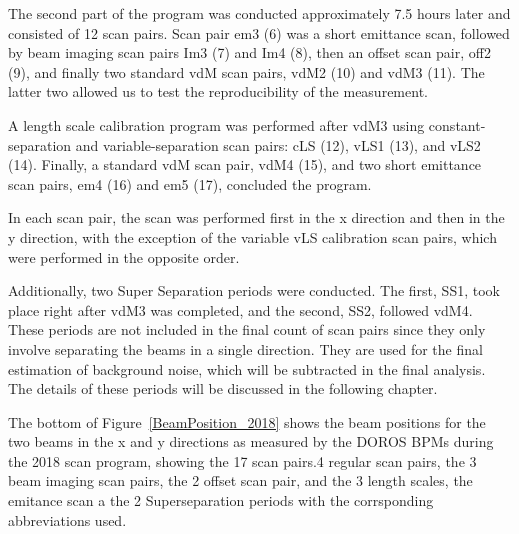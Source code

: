 The second part of the program was conducted approximately 7.5 hours later and consisted of 12 scan pairs. Scan pair em3 (6) was a short emittance scan, followed by beam imaging scan pairs Im3 (7) and Im4 (8), then an offset scan pair, off2 (9), and finally two standard vdM scan pairs, vdM2 (10) and vdM3 (11). The latter two allowed us to test the reproducibility of the measurement.  

A length scale calibration program was performed after vdM3 using constant-separation and variable-separation scan pairs: cLS (12), vLS1 (13), and vLS2 (14). Finally, a standard vdM scan pair, vdM4 (15), and two short emittance scan pairs, em4 (16) and em5 (17), concluded the program.  

In each scan pair, the scan was performed first in the x direction and then in the y direction, with the exception of the variable vLS calibration scan pairs, which were performed in the opposite order.  

Additionally, two Super Separation periods were conducted. The first, SS1, took place right after vdM3 was completed, and the second, SS2, followed vdM4. These periods are not included in the final count of scan pairs since they only involve separating the beams in a single direction. They are used for the final estimation of background noise, which will be subtracted in the final analysis. The details of these periods will be discussed in the following chapter.  

The bottom of Figure~\ref{BeamPosition_2018} shows the beam positions for the two beams in the x and y directions as measured by the DOROS BPMs during the 2018 scan program, showing the 17 scan pairs.4 regular scan pairs, the 3 beam imaging scan pairs, the 2 offset scan pair, and the 3 length scales, the emitance scan a the 2 Superseparation periods with the corrsponding abbreviations used.  




